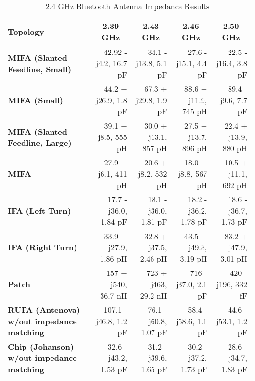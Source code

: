 \documentclass[journal,compsoc]{IEEEtran}
\begin{document}
\begin{table*}[t]
  \centering
  \begin{tabular}{>{\bfseries}l|l l l l}
  \hline
    Topology & \multicolumn{1}{|c|}{2.39 GHz} & \multicolumn{1}{|c|}{2.43 GHz} & \multicolumn{1}{|c|}{2.46 GHz} & \multicolumn{1}{|c|}{2.50 GHz} \\
    \hline
    MIFA (Slanted Feedline, Small) & \multicolumn{1}{|r|}{42.92 - j4.2, 16.7 pF} & \multicolumn{1}{|r|}{34.1 - j13.8, 5.1 pF} & \multicolumn{1}{|r|}{27.6 - j15.1, 4.4 pF} & \multicolumn{1}{|r|}{22.5 - j16.4, 3.8 pF} \\
    MIFA (Small) & \multicolumn{1}{|r|}{44.2 + j26.9, 1.8 pF} & \multicolumn{1}{|r|}{67.3 + j29.8, 1.9 pF} & \multicolumn{1}{|r|}{88.6 + j11.9, 745 pH} & \multicolumn{1}{|r|}{89.4 - j9.6, 7.7 pF} \\
    MIFA (Slanted Feedline, Large) & \multicolumn{1}{|r|}{39.1 + j8.5, 555 pH} & \multicolumn{1}{|r|}{30.0 + j13.1, 857 pH} & \multicolumn{1}{|r|}{27.5 + j13.7, 896 pH} & \multicolumn{1}{|r|}{22.4 + j13.9, 880 pH} \\
    MIFA & \multicolumn{1}{|r|}{27.9 + j6.1, 411 pH} & \multicolumn{1}{|r|}{20.6 + j8.2, 532 pH} & \multicolumn{1}{|r|}{18.0 + j8.8, 567 pH} & \multicolumn{1}{|r|}{10.5 + j11.1, 692 pH} \\
    IFA (Left Turn) & \multicolumn{1}{|r|}{17.7 - j36.0, 1.84 pF} & \multicolumn{1}{|r|}{18.1 - j36.0, 1.81 pF} & \multicolumn{1}{|r|}{18.2 - j36.2, 1.78 pF} & \multicolumn{1}{|r|}{18.6 - j36.7, 1.73 pF} \\
    IFA (Right Turn) & \multicolumn{1}{|r|}{33.9 + j27.9, 1.86 pH} & \multicolumn{1}{|r|}{32.8 + j37.5, 2.46 pH} & \multicolumn{1}{|r|}{43.5 + j49.3, 3.19 pH} & \multicolumn{1}{|r|}{83.2 + j47.9, 3.01 pH} \\
    Patch & \multicolumn{1}{|r|}{157 + j540, 36.7 nH} & \multicolumn{1}{|r|}{723 + j463, 29.2 nH} & \multicolumn{1}{|r|}{716 - j37.0, 2.1 pF} & \multicolumn{1}{|r|}{420 - j196, 332 fF} \\
    RUFA (Antenova) w/out impedance matching & \multicolumn{1}{|r|}{107.1 - j46.8, 1.2 pF} & \multicolumn{1}{|r|}{76.1 - j60.8, 1.07 pF} & \multicolumn{1}{|r|}{58.4 - j58.6, 1.1 pF} & \multicolumn{1}{|r|}{44.6 - j53.1, 1.2 pF} \\
    Chip (Johanson) w/out impedance matching & \multicolumn{1}{|r|}{32.6 - j43.2, 1.53 pF} & \multicolumn{1}{|r|}{31.2 - j39.6, 1.65 pF} & \multicolumn{1}{|r|}{30.2 - j37.2, 1.73 pF} & \multicolumn{1}{|r|}{28.6 - j34.7, 1.83 pF} \\ \hline
  \end{tabular} \linebreak
  \caption{2.4 GHz Bluetooth Antenna Impedance Results}
\end{table*}
\end{document}
